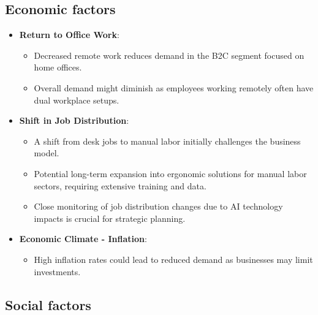 \subsection{Economic factors}


\begin{itemize}
  \item \textbf{Return to Office Work}:
  \begin{itemize}
    \item Decreased remote work reduces demand in the B2C segment focused on home offices.
    \item Overall demand might diminish as employees working remotely often have dual workplace setups.
  \end{itemize}

  \item \textbf{Shift in Job Distribution}:
  \begin{itemize}
    \item A shift from desk jobs to manual labor initially challenges the business model.
    \item Potential long-term expansion into ergonomic solutions for manual labor sectors, requiring extensive training and data.
    \item Close monitoring of job distribution changes due to AI technology impacts is crucial for strategic planning.
  \end{itemize}

  \item \textbf{Economic Climate - Inflation}:
  \begin{itemize}
    \item High inflation rates could lead to reduced demand as businesses may limit investments.
  \end{itemize}
\end{itemize}

\subsection{Social factors}


